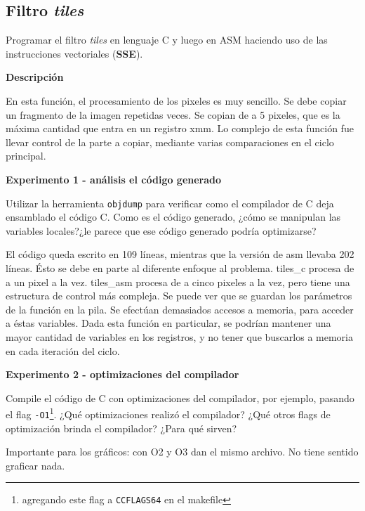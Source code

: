 \subsection*{Filtro \textit{tiles}}

Programar el filtro \textit{tiles} en lenguaje C y luego en ASM haciendo uso de las instrucciones vectoriales (\textbf{SSE}).
    

\vspace*{0.3cm} \noindent
\textbf{Descripción}

En esta función, el procesamiento de los pixeles es muy sencillo. Se debe copiar un fragmento de la imagen repetidas veces. Se copian de a 5 
pixeles, que es la máxima cantidad que entra en un registro xmm. Lo complejo de esta función fue llevar control de la parte a copiar, mediante
varias comparaciones en el ciclo principal.


\vspace*{0.3cm} \noindent
\textbf{Experimento 1 - análisis el código generado}

Utilizar la herramienta \verb|objdump| para verificar como el compilador de C deja ensamblado el código C. Como es el código generado, ¿cómo se manipulan las variables locales?¿le parece que ese código generado podría optimizarse?


El código queda escrito en 109 líneas, mientras que la versión de asm llevaba 202 líneas. Ésto se debe en parte al diferente enfoque al problema.
tiles\_c procesa de a un pixel a la vez. tiles\_asm procesa de a cinco pixeles a la vez, pero tiene una estructura de control más compleja.
Se puede ver que se guardan los parámetros de la función en la pila. Se efectúan demasiados accesos a memoria, para acceder a éstas variables.
Dada esta función en particular, se podrían mantener una mayor cantidad de variables en los registros, y no tener que buscarlos a memoria en cada
iteración del ciclo.


\newpage
\vspace*{0.3cm} \noindent
\textbf{Experimento 2 - optimizaciones del compilador}

Compile el código de C con optimizaciones del compilador, por ejemplo, pasando el flag \verb|-O1|\footnote{agregando este flag a \texttt{CCFLAGS64} en el makefile}. 
¿Qué optimizaciones realizó el compilador?
¿Qué otros flags de optimización brinda el compilador?
¿Para qué sirven?

Importante para los gráficos: con O2 y O3 dan el mismo archivo. No tiene sentido graficar nada.

